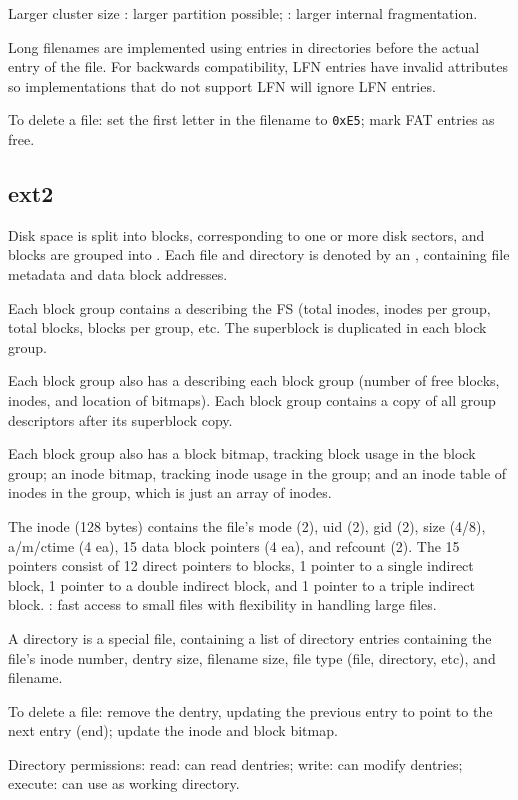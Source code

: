 \documentclass[fontsize=9pt,twoside]{slnotes}
\newcommand\benefits{\checkmark}
\newcommand\problems{\textsymbol{✗}}
\begin{document}
Larger cluster size \benefits: larger partition possible; \problems: larger internal fragmentation.

Long filenames are implemented using entries in directories before the actual entry of the file. For backwards compatibility, LFN entries have invalid attributes so implementations that do not support LFN will ignore LFN entries.

To delete a file: set the first letter in the filename to \texttt{0xE5}; mark FAT entries as free.

\subsection{ext2}
Disk space is split into blocks, corresponding to one or more disk sectors, and blocks are grouped into . Each file and directory is denoted by an , containing file metadata and data block addresses.

Each block group contains a  describing the FS (total inodes, inodes per group, total blocks, blocks per group, etc. The superblock is duplicated in each block group.

Each block group also has a  describing each block group (number of free blocks, inodes, and location of bitmaps). Each block group contains a copy of all group descriptors after its superblock copy.

Each block group also has a block bitmap, tracking block usage in the block group; an inode bitmap, tracking inode usage in the group; and an inode table of inodes in the group, which is just an array of inodes.

The inode (128 bytes) contains the file's mode (2), uid (2), gid (2), size (4/8), a/m/ctime (4 ea), 15 data block pointers (4 ea), and refcount (2). The 15 pointers consist of 12 direct pointers to blocks, 1 pointer to a single indirect block, 1 pointer to a double indirect block, and 1 pointer to a triple indirect block. \benefits: fast access to small files with flexibility in handling large files.

A directory is a special file, containing a list of directory entries containing the file's inode number, dentry size, filename size, file type (file, directory, etc), and filename.

To delete a file: remove the dentry, updating the previous entry to point to the next entry (end); update the inode and block bitmap.

Directory permissions: read: can read dentries; write: can modify dentries; execute: can use as working directory.
\end{document}
